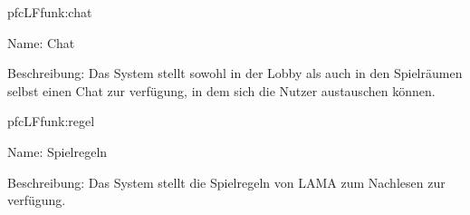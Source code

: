 \begin{description}[leftmargin=5em, style=sameline]
	\begin{lhp}{pfc}{LF}{funk:chat}
		\item [Name:] Chat
		\item [Beschreibung:] Das System stellt sowohl in der Lobby als auch in den Spielräumen selbst einen Chat zur verfügung, in dem sich die Nutzer austauschen können.
	\end{lhp}
	
	\begin{lhp}{pfc}{LF}{funk:regel}
		\item [Name:] Spielregeln
		\item [Beschreibung:] Das System stellt die Spielregeln von LAMA zum Nachlesen zur verfügung.
	\end{lhp}


\end{description}


